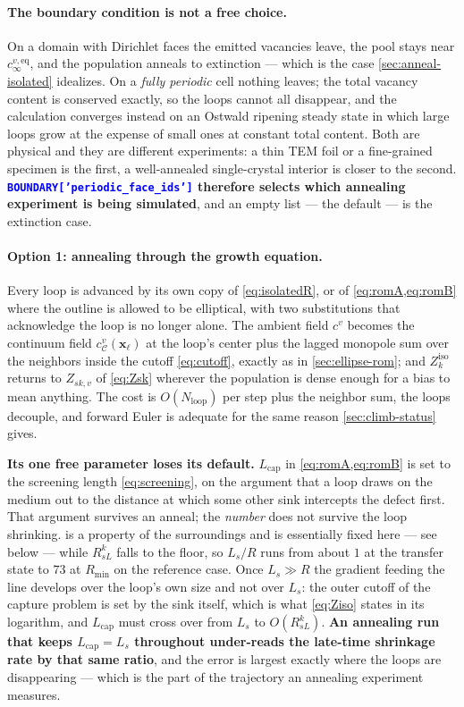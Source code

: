 \documentclass{article}
\newcommand{\textttclr}[1]{\textcolor{blue}{\texttt{#1}}}
\begin{document}
\paragraph{The boundary condition is not a free choice.} On a domain with
Dirichlet faces the emitted vacancies leave, the pool stays near
$c^{v,\mathrm{eq}}_\infty$, and the population anneals to extinction --- which is
the case \cref{sec:anneal-isolated} idealizes. On a \emph{fully periodic} cell
nothing leaves; the total vacancy content is conserved exactly, so the loops
cannot all disappear, and the calculation converges instead on an Ostwald
ripening steady state in which large loops grow at the expense of small ones at
constant total content. Both are physical and they are different experiments: a
thin TEM foil or a fine-grained specimen is the first, a well-annealed
single-crystal interior is closer to the second. \textbf{\textttclr{BOUNDARY['periodic\_face\_ids']} therefore selects
which annealing experiment is being simulated}, and an empty list --- the default --- is the extinction case.

\paragraph{Option 1: annealing through the growth equation.} Every loop is
advanced by its own copy of \cref{eq:isolatedR}, or of
\cref{eq:romA,eq:romB} where the outline is allowed to be elliptical, with two
substitutions that acknowledge the loop is no longer alone. The ambient field
$c^{v}$ becomes the continuum field $c^{v}_{\mathcal C}(\bm x_\ell)$ at the loop's
center plus the lagged monopole sum over the neighbors inside the cutoff
\cref{eq:cutoff}, exactly as in \cref{sec:ellipse-rom}; and $Z^{\mathrm{iso}}_k$
returns to $Z_{sk,v}$ of \cref{eq:Zsk} wherever the population is dense enough
for a bias to mean anything. The cost is $O(N_{\mathrm{loop}})$ per step plus the
neighbor sum, the loops decouple, and forward Euler is adequate for the same
reason \cref{sec:climb-status} gives.

\textbf{Its one free parameter loses its default.} $L_{\mathrm{cap}}$ in
\cref{eq:romA,eq:romB} is set to the screening length \cref{eq:screening}, on the
argument that a loop draws on the medium out to the distance at which some other
sink intercepts the defect first. That argument survives an anneal; the
\emph{number} does not survive the loop shrinking.  is a
property of the surroundings and is essentially fixed here --- see below --- while
$R^k_{sL}$ falls to the floor, so $L_s/R$ runs from about $1$ at the transfer
state to $73$ at $R_{\min}$ on the reference case. Once $L_s\gg R$ the gradient
feeding the line develops over the loop's own size and not over $L_s$: the outer
cutoff of the capture problem is set by the sink itself, which is what
\cref{eq:Ziso} states in its logarithm, and $L_{\mathrm{cap}}$ must cross over
from $L_s$ to $O(R^k_{sL})$. \textbf{An
annealing run that keeps $L_{\mathrm{cap}}=L_s$ throughout under-reads the
late-time shrinkage rate by that same ratio}, and the error is largest exactly
where the loops are disappearing --- which is the part of the trajectory an
annealing experiment measures.
\end{document}
